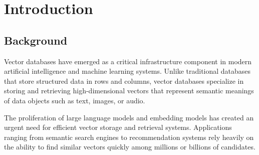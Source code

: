 \documentclass[12pt,a4paper]{article}
\begin{document}
\begin{abstract}
This document presents VectorDB, a high-performance vector database system implemented entirely from scratch using custom data structures in C++. The system enables efficient storage, indexing, and retrieval of high-dimensional vector embeddings generated from textual data. VectorDB addresses the growing need for semantic search capabilities in modern applications by implementing state-of-the-art algorithms including hierarchical navigable small world graphs (HNSW-inspired), brute-force search, and persistent storage with compression. The project demonstrates advanced understanding of fundamental data structures including dynamic arrays, heaps, graphs, B-trees, hash maps, and Huffman encoding. The system integrates with Google's Gemini API for generating 128-dimensional embeddings and provides both exact and approximate nearest neighbor search capabilities. Performance analysis shows that the graph-based approximate search achieves significant speedup compared to brute-force methods while maintaining high recall rates. This implementation serves as both a practical tool for semantic search applications and an educational resource demonstrating real-world applications of classical data structures and algorithms.
\end{abstract}

\newpage

\section{Introduction}

\subsection{Background}
Vector databases have emerged as a critical infrastructure component in modern artificial intelligence and machine learning systems. Unlike traditional databases that store structured data in rows and columns, vector databases specialize in storing and retrieving high-dimensional vectors that represent semantic meanings of data objects such as text, images, or audio.

The proliferation of large language models and embedding models has created an urgent need for efficient vector storage and retrieval systems. Applications ranging from semantic search engines to recommendation systems rely heavily on the ability to find similar vectors quickly among millions or billions of candidates.
\end{document}
